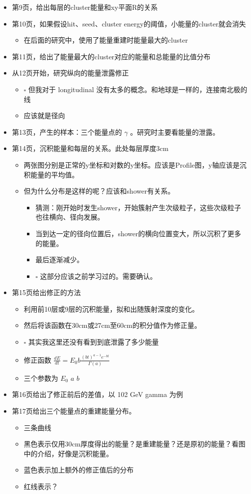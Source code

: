\documentclass[11pt]{article}
\begin{document}
\begin{itemize}
\item 第9页，给出每层的cluster能量和xy平面R的关系
\item 第10页，如果假设hit、seed、cluster energy的阈值，小能量的cluster就会消失
\begin{itemize}
\item 在后面的研究中，使用了能量重建时能量最大的cluster
\end{itemize}
\item 第11页，给出了能量最大的cluster对应的能量和总能量的比值分布

\item 从12页开始，研究纵向的能量泄露修正
\begin{itemize}
\item{$\square$} 但我对于 longitudinal 没有太多的概念。和地球是一样的，连接南北极的线
\item 应该就是径向
\end{itemize}
\item 第13页，产生的样本：三个能量点的 \(\gamma\) 。研究时主要看能量的泄露。
\item 第14页，沉积能量和每层的关系。此处每层厚度3cm
\begin{itemize}
\item 两张图分别是正常的y坐标和对数的y坐标。应该是Profile图，y轴应该是沉积能量的平均值。
\item 但为什么分布是这样的呢？应该和shower有关系。
\begin{itemize}
\item 猜测：刚开始时发生shower，开始簇射产生次级粒子，这些次级粒子也往横向、径向发展。
\item 当到达一定的径向位置后，shower的横向位置变大，所以沉积了更多的能量。
\item 最后逐渐减少。
\item{$\square$} 这部分应该之前学习过的。需要确认。
\end{itemize}
\end{itemize}
\item 第15页给出修正的方法
\begin{itemize}
\item 利用前10层或9层的沉积能量，拟和出随簇射深度的变化。
\item 然后将该函数在30cm或27cm至60cm的积分值作为修正量。
\item{$\square$} 其实我这里还没有看到到底泄露了多少能量
\item 修正函数 \(\frac{dE}{dt} = E_0 b \frac{(bt)^{a-1}e^{-bt}}{\Gamma(a)}\)
\item 三个参数为 \(E_0\) \(a\) \(b\)
\end{itemize}
\item 第16页给出了修正前后的差值，以 102 GeV gamma 为例
\item 第17页给出三个能量点的重建能量分布。
\begin{itemize}
\item 三条曲线
\item 黑色表示仅用30cm厚度得出的能量？是重建能量？还是原初的能量？看图中的介绍，好像是沉积能量。
\item 蓝色表示加上额外的修正值后的分布
\item 红线表示？
\end{itemize}
\end{itemize}
\end{document}
